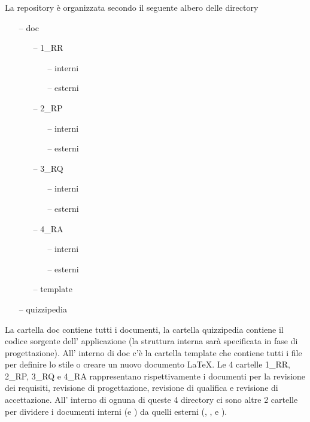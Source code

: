 \documentclass[12pt,a4paper]{article}
\begin{document}
\newpage
{}
La repository è organizzata secondo il seguente albero delle directory
\begin{itemize}
\item[--] doc
\begin{itemize}
\item[--] 1\_RR
\begin{itemize}
\item[--] interni
\item[--] esterni
\end{itemize}
\item[--] 2\_RP
\begin{itemize}
\item[--] interni
\item[--] esterni
\end{itemize}
\item[--] 3\_RQ
\begin{itemize}
\item[--] interni
\item[--] esterni
\end{itemize}
\item[--] 4\_RA
\begin{itemize}
\item[--] interni
\item[--] esterni
\end{itemize}
\item[--] template
\end{itemize}
\item[--] quizzipedia
\end{itemize}

La cartella doc contiene tutti i documenti, la cartella quizzipedia contiene il codice sorgente dell' applicazione (la struttura interna sarà specificata in fase di progettazione). All' interno di doc c'è la cartella template che contiene tutti i file per definire lo stile o creare un nuovo documento \LaTeX{}. Le 4 cartelle 1\_RR, 2\_RP, 3\_RQ e 4\_RA rappresentano rispettivamente i documenti per la revisione dei requisiti, revisione di progettazione, revisione di qualifica e revisione di accettazione. All' interno di ognuna di queste 4 directory ci sono altre 2 cartelle per dividere i documenti interni (\NdP e \SdF) da quelli esterni (\AdR, \GlO, \PdP e \PdQ).

\newpage
\end{document}
